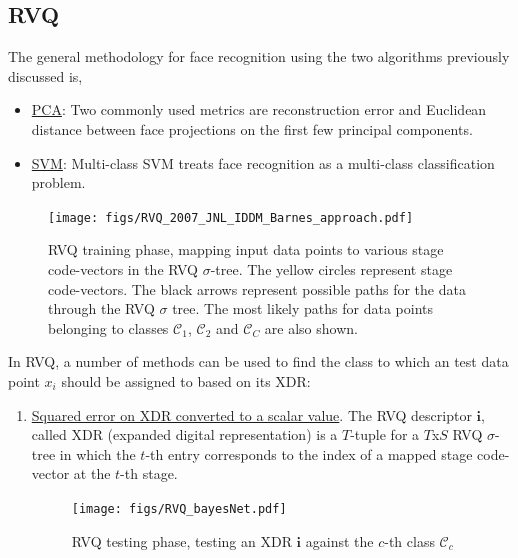 \begin{Body}
\subsection{RVQ}
\label{subsec:RVQ}
The general methodology for face recognition using the two algorithms previously discussed is,

\begin{itemize}
\item \underline{PCA}: Two commonly used metrics are reconstruction error and Euclidean distance between face projections on the first few principal components.
\item \underline{SVM}: Multi-class SVM treats face recognition as a multi-class classification problem.  
\end{itemize}
								\begin{figure}[t]
								\centering
								\texttt{[image: figs/RVQ\_2007\_JNL\_IDDM\_Barnes\_approach.pdf]}
								\caption{RVQ training phase, mapping input data points to various stage code-vectors in the RVQ $\sigma$-tree.  The yellow circles represent stage code-vectors.  The black arrows represent possible paths for the data through the RVQ $\sigma$ tree.  The most likely paths for data points belonging to classes $\mathcal{C}_1$, $\mathcal{C}_2$ and $\mathcal{C}_C$ are also shown.}
								\label{fig:RVQ_2007_JNL_IDDM_Barnes_approach}
								\end{figure}



In RVQ, a number of methods can be used to find the class to which an test data point $x_i$ should be assigned to based on its XDR:

\begin{enumerate}
\item \underline{Squared error on XDR converted to a scalar value}.  The RVQ descriptor $\mathbf{i}$, called XDR (expanded digital representation) \cite{2007_JNL_IDDM_Barnes} is a $T$-tuple for a $T$x$S$ RVQ $\sigma$-tree in which the $t$-th entry corresponds to the index of a mapped stage code-vector at the $t$-th stage.  
							\begin{figure}[t]
							\centering
							\texttt{[image: figs/RVQ\_bayesNet.pdf]}
							\caption{RVQ testing phase, testing an XDR $\mathbf{i}$ against the $c$-th class $\mathcal{C}_c$}
							\label{fig:RVQ_bayesNet.pdf}
							\end{figure}





\end{enumerate}
\end{Body}
